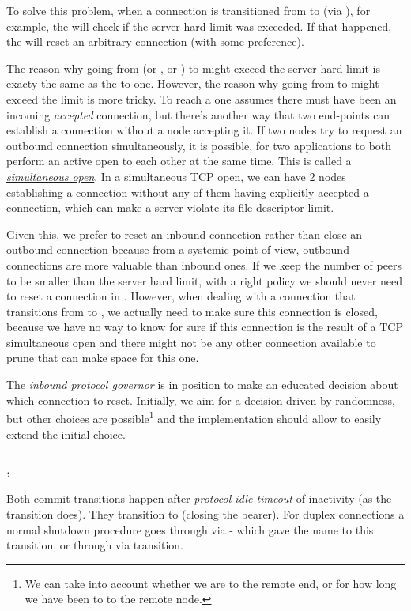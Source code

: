 To solve this problem, when a connection is transitioned from
\DuplexState{} to \InboundStateDup{} (via \DemotedToColdDupLoc{}), for example,
the \connmngr{} will check if the server hard limit was exceeded. If that
happened, the \connmngr{} will reset an arbitrary connection (with some preference).

The reason why going from \OutboundStateDupTau{} (or \OutboundStateDup{}, or
\OutboundIdleStateDup{}) to \InboundStateDup{} might exceed the server hard limit
is exacty the same as the \DuplexState{} to \InboundStateDup{} one.
However, the reason why going from \OutboundStateDupTau{} to \DuplexState{} might
exceed the limit is more tricky.  To reach a \DuplexState{} one assumes there must
have been an incoming \textit{accepted} connection, but there's another way that two
end-points can establish a connection without a node accepting it. If two nodes try
to request an outbound connection simultaneously, it is possible, for two applications
to both perform an active open to each other at the same time.  This is called a
\href{https://flylib.com/books/en/3.223.1.190/1/}{\textit{simultaneous open}}.
In a simultaneous TCP open, we can have 2 nodes establishing a connection without any of
them having explicitly accepted a connection, which can make a server violate its file
descriptor limit.

Given this, we prefer to reset an inbound connection rather than close an outbound
connection because from a systemic point of view, outbound connections are more
valuable than inbound ones. If we keep the number of \established{} peers to
be smaller than the server hard limit, with a right policy we should never need
to reset a connection in \DuplexState{}. However, when dealing with a connection that
transitions from \OutboundStateDupTau{} to \DuplexState{}, we actually need to
make sure this connection is closed, because we have no way to know for sure
if this connection is the result of a TCP simultaneous open and there might
not be any other connection available to prune that can make space for this one.

The \textit{inbound protocol governor} is in position to make an educated
decision about which connection to reset. Initially, we aim for a decision driven by
randomness, but other choices are possible\footnote{We can take into account
whether we are \hot{} to the remote end, or for how long we have been \hot{} to
to the remote node.} and the implementation should allow to easily extend the
initial choice.


\subsubsection{\CommitUniRem{}, \CommitDupRem{}}\label{sec:tr_commit_rem}
Both commit transitions happen after \textit{protocol idle timeout} of
inactivity (as the \TimeoutExpired{} transition does). They transition to
\TerminatingState{} (closing the bearer). For duplex connections a normal
shutdown procedure goes through \InboundIdleStateDup{}
via \CommitDupRem{} - which gave the name to this transition, or through
\OutboundIdleStateDup{} via \CommitDupLoc{} transition.

